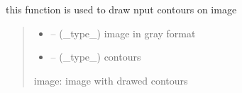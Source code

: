 \documentclass[letterpaper,10pt,english]{sphinxmanual}
\begin{document}
\begin{savenotes}\begin{fulllineitems}
\label{\detokenize{setting/backend/pxvalue_calibration:oxin.backend.pxvalue_calibration.draw_contour}}
\pysigstartsignatures
{}
\pysigstopsignatures
\sphinxAtStartPar
this function is used to draw nput contours on image
\begin{quote}\begin{description}
\begin{itemize}
\item {} 
\sphinxAtStartPar
{} – (\_type\_) image in gray format

\item {} 
\sphinxAtStartPar
{} – (\_type\_) contours

\end{itemize}

\sphinxAtStartPar
image: image with drawed contours

\end{description}\end{quote}

\end{fulllineitems}\end{savenotes}

\end{document}
